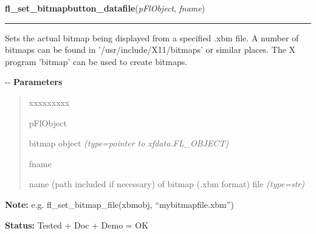 \hspace{.8\funcindent}\begin{boxedminipage}{\funcwidth}

    \raggedright \textbf{fl\_set\_bitmapbutton\_datafile}(\textit{pFlObject}, \textit{fname})

    \vspace{-1.5ex}

    \rule{\textwidth}{0.5\fboxrule}
\setlength{\parskip}{2ex}

Sets the actual bitmap being displayed from a specified .xbm file. A
number of bitmaps can be found in '/usr/include/X11/bitmaps' or similar
places. The X program 'bitmap' can be used to create bitmaps.

-{}-
\setlength{\parskip}{1ex}
      \textbf{Parameters}
      \vspace{-1ex}

      \begin{quote}
        \begin{Ventry}{xxxxxxxxx}

          \item[pFlObject]


bitmap object
            {\it (type=pointer to xfdata.FL\_OBJECT)}

          \item[fname]


name (path included if necessary) of bitmap (.xbm format) file
            {\it (type=str)}

        \end{Ventry}

      \end{quote}

\textbf{Note:} 
e.g. fl\_set\_bitmap\_file(xbmobj, ``mybitmapfile.xbm'')


\textbf{Status:} 
Tested + Doc + Demo = OK


    \end{boxedminipage}

    \label{xformslib:flbitmap:fl_read_bitmapfile}

    \vspace{0.5ex}

